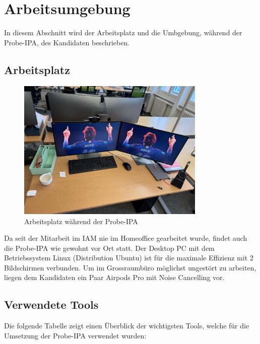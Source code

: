 \chapter{Arbeitsumgebung}\label{ch:arbeitsumgebung}
In diesem Abschnitt wird der Arbeitsplatz und die Umbgebung, während der Probe-IPA, des Kandidaten beschrieben.
\section{Arbeitsplatz}\label{sec:arbeitsplatz}

\begin{figure}[H]
    \begin{center}
        \includegraphics[width=0.8\textwidth]{ressourcen/arbeitsplatz}
        \caption[Arbeitsplatz]{Arbeitsplatz während der Probe-IPA}\label{fig:arbeitsplatz}
    \end{center}
\end{figure}

Da seit der Mitarbeit im IAM nie im Homeoffice gearbeitet wurde, findet auch die Probe-IPA wie gewohnt vor Ort statt. Der Desktop PC mit dem Betriebssystem Linux (Distribution Ubuntu) ist für die maximale Effizienz mit 2 Bildschirmen verbunden. Um im Grossraumbüro möglichst ungestört zu arbeiten, liegen dem Kandidaten ein Paar Airpods Pro mit Noise Cancelling vor.

\newpage \section{Verwendete Tools}\label{sec:verwendete-tools}
Die folgende Tabelle zeigt einen Überblick der wichtigsten Tools, welche für die Umsetzung der Probe-IPA verwendet wurden:

